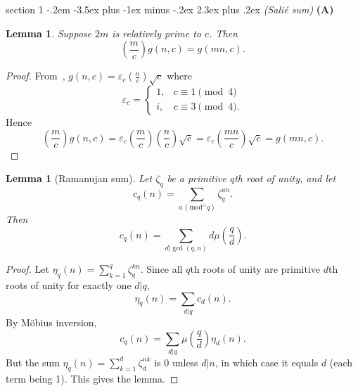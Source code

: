 \documentclass[12pt]{article}
\makeatletter
\theoremstyle{norm}
\newtheorem{lem}[thm]{Lemma}
\newcommand{\ep}[0]{\varepsilon}
\newcommand{\pa}[1]{\left( {#1} \right)}
\newcommand{\subprob}[1]{\noindent\textbf{#1}\\}
\newcommand{\pf}[2]{\pa{\frac{#1}{#2}}}
\newcommand{\mmod}[1]{\,(\text{mod}^{\times} #1)}
\newcommand{\nmod}[1]{\,(\text{mod}\, #1)}
\newenvironment{problem}{\@startsection
       {section}
       {1}
       {-.2em}
       {-3.5ex plus -1ex minus -.2ex}
       {2.3ex plus .2ex}
       {\pagebreak[3]%
       \large\bf\noindent{Problem }
       }
       }
       {%
       }
\makeatother
\begin{document}
\begin{problem}{\it (Sali\'e sum)}
\subprob{(A)}
\begin{lem}\label{gausssum}
Suppose $2m$ is relatively prime to $c$. Then
\[
\pf mc g(n,c)=g(mn,c).
\]
\end{lem}
\begin{proof}
From~\cite[4.8]{iwaniec}, $g(n,c)=\ep_c\pf nc\sqrt c$ where 
\[
\ep_c=\begin{cases}
1,&c\equiv1\pmod 4\\
i,&c\equiv 3\pmod 4.
\end{cases}
\]
Hence 
\[\pf mc g(n,c)=\ep_c \pf mc\pf nc \sqrt c=\ep_c\pf{mn}{c}\sqrt c=g(mn,c).
\]
\end{proof}
\begin{comment}
\begin{proof}
Note $g(m,c)$ for fixed $c$ is constant for $m$ a quadratic residue relatively prime to $c$, because if $m\equiv j^2\nmod m$, then
\[
g(m,c)=\sum_{t\nmod c}e\pf{(jt)^2}{c}
=\sum_{t\nmod c}e\pf{t^2}{c}=g(1,c),
\]
by replacing $jt$ with $t$. Similarly, if $m$ is a quadratic nonresidue relatively prime to $c$, then we can write $m\equiv j^2k\nmod m$ where $k$ is a fixed quadratic nonresidue relatively prime to $c$, and find
\[
g(m,c)=\sum_{t\nmod c}e\pf{k(jt)^2}{c}
=\sum_{t\nmod c}e\pf{kt^2}{c}=g(k,c).
\]

Now suppose $c=p^a$ where $p\neq 2$. Then
\begin{align*}
\sum_{t\mmod{p^a}}e\pf{t^2}{p^a}+\sum_{t\nmod p^a} e\pf{kt^2}{p^a}
&=
\pa{\sum_{t\mmod{p^a}}e\pf{t^2}{p^a}
+\sum_{t\mmod{p^{a-1}}}e\pf{t^2}{p^{a-2}}
+\cdots 
+\sum_{t\mmod{1}}e\pf{t^2}{p^{-a}}}\\
&\quad
+\pa{\sum_{t\nmod c} e\pf{kt^2}{c}
\sum_{t\mmod{p^{a-1}}}e\pf{kt^2}{p^{a-2}}
+\cdots +
+\sum_{t\mmod{1}}e\pf{kt^2}{p^{-a}}
}\\
&=2\pa{\sum_{t\mmod{p^a}}e\pf{t}{p^a}+\cdots 
+\sum_{t\mmod{1}}e\pf{t}{p^{-a}}}\\
&=0
\end{align*}
by Lemma.

Note that for $m$ a quadratic residue and $m'$ not a quadratic residue, we have
\[
g(m,c)+g(m',c')=\sum_{t\nmod c}e\pf{t^2}{c} + \sum_{t\nmod c} e\pf{kt^2}{c}=2\sum_{t\mmod c}
\]
\end{proof}
\end{comment}
\begin{lem}[Ramanujan sum]
Let $\zeta_q$ be a primitive $q$th root of unity, and let
\[
c_q(n)=\sum_{a\mmod{q}}\zeta_q^{an}.
\]
Then
\[
c_q(n)=\sum_{d|\gcd(q,n)}d\mu\pf qd.
\]
\end{lem}
\begin{proof}
Let $\eta_q(n)=\sum_{k=1}^q \zeta_q^{kn}$. Since all $q$th roots of unity are primitive $d$th roots of unity for exactly one $d|q$,
\[
\eta_q(n)=\sum_{d|q}c_d(n).
\] 
By M\"obius inversion,
\[
c_q(n)=\sum_{d|q}\mu\pf qd \eta_d (n).
\]
But the sum $\eta_q(n)=\sum_{k=1}^d \zeta_d^{nk}$ is 0 unless $d|n$, in which case it equals $d$ (each term being 1). This gives the lemma.
\end{proof}


\end{problem}
\end{document}

